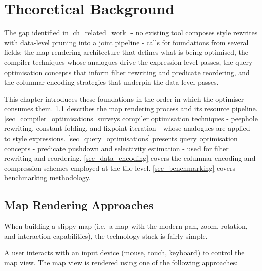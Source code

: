\chapter{Theoretical Background}\label{ch_theoretical_background}

The gap identified in \cref{ch_related_work} - no existing tool composes style rewrites with data-level pruning into a joint pipeline - calls for foundations from several fields: the map rendering architecture that defines what is being optimised, the compiler techniques whose analogues drive the expression-level passes, the query optimisation concepts that inform filter rewriting and predicate reordering, and the columnar encoding strategies that underpin the data-level passes.

This chapter introduces these foundations in the order in which the optimiser consumes them.
\cref{sec_map_rendering_approaches} describes the map rendering process and its resource pipeline.
\cref{sec_compiler_optimisations} surveys compiler optimisation techniques - peephole rewriting, constant folding, and fixpoint iteration - whose analogues are applied to style expressions.
\cref{sec_query_optimisations} presents query optimisation concepts - predicate pushdown and selectivity estimation - used for filter rewriting and reordering.
\cref{sec_data_encoding} covers the columnar encoding and compression schemes employed at the tile level.
\cref{sec_benchmarking} covers benchmarking methodology.

\section{Map Rendering Approaches}\label{sec_map_rendering_approaches}

When building a slippy map (i.e.\ a map with the modern pan, zoom, rotation, and interaction capabilities), the technology stack is fairly simple.

A user interacts with an input device (mouse, touch, keyboard) to control the map view.
The map view is rendered using one of the following approaches:

